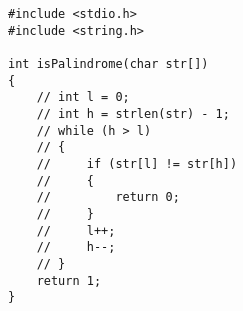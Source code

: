 
\begin{lstlisting}[style=CStyle, caption=Mutant M6 of function isPalindrome., label=isPalindrome_m6]
#include <stdio.h> 
#include <string.h> 

int isPalindrome(char str[]) 
{ 
    // int l = 0; 
    // int h = strlen(str) - 1; 
    // while (h > l) 
    // { 
    //     if (str[l] != str[h]) 
    //     { 
    //         return 0;
    //     } 
    //     l++;
    //     h--;
    // } 
    return 1; 
} 
\end{lstlisting}